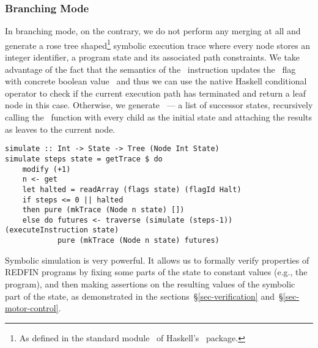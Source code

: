 \subsubsection{Branching Mode}

In branching mode, on the contrary, we do not perform any merging at all and
generate a rose tree shaped\footnote{As defined in the standard
module~ of Haskell's~ package.} symbolic
execution trace where every node stores an integer identifier, a program state
and its associated path constraints. We take advantage of the fact that the
semantics of the~ instruction updates the~ flag with concrete
boolean value~ and thus we can use the native Haskell conditional
operator to check if the current execution path has terminated and return a leaf
node in this case. Otherwise, we generate~ --- a list of successor
states, recursively calling the~ function with every child as the
initial state and attaching the results as leaves to the current node.

\vspace{1mm}
\begin{verbatim}
simulate :: Int -> State -> Tree (Node Int State)
simulate steps state = getTrace $ do
    modify (+1)
    n <- get
    let halted = readArray (flags state) (flagId Halt)
    if steps <= 0 || halted
    then pure (mkTrace (Node n state) [])
    else do futures <- traverse (simulate (steps-1)) (executeInstruction state)
            pure (mkTrace (Node n state) futures)
\end{verbatim}
\vspace{1mm}

\noindent
Symbolic simulation is very powerful. It allows us to formally verify properties
of REDFIN programs by fixing some parts of the state to constant values (e.g.,
the program), and then making assertions on the resulting values of
the symbolic part of the state, as demonstrated in the
sections~\S\ref{sec-verification} and~\S\ref{sec-motor-control}.
